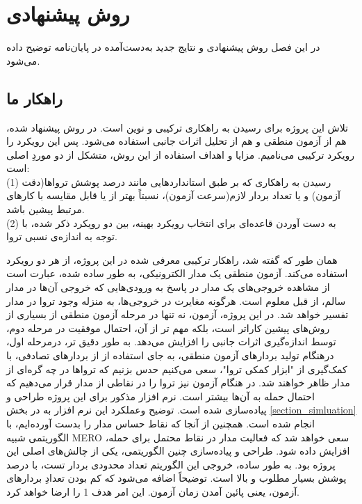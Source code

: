 \chapter{روش پیشنهادی}
در این فصل روش پیشنهادی و نتایج جدید به‌دست‌آمده در پایان‌نامه توضیح داده می‌شود.
\section{راهکار ما}
تلاش این پروژه برای رسیدن به راهکاری ترکیبی و نوین است. در روش پیشنهاد شده، هم از آزمون منطقی و هم از تحلیل اثرات جانبی استفاده می‌شود. پس این رویکرد را رویکرد ترکیبی می‌نامیم. مزایا و اهداف استفاده از این روش، متشکل از دو موردِ اصلی است: \\
(1) رسیدن به راهکاری که بر طبق استانداردهایی مانند درصد پوشش تروا‌ها(دقت آزمون) و یا تعداد بردار لازم(سرعت آزمون)، نسبتاً بهتر از یا قابل مقایسه با کارهای مرتبط پیشین باشد. \\
(2) به دست آوردن قاعده‌ای برای انتخاب رویکرد بهینه، بین دو رویکرد ذکر شده، با توجه به اندازه‌ی نسبی تروا. 

همان طور که گفته شد، راهکار ترکیبی معرفی شده در این پروژه، از هر دو رویکرد استفاده می‌کند. آزمون منطقی یک مدار الکترونیکی، به طور ساده شده، عبارت است از مشاهده خروجی‌های یک مدار در پاسخ به ورودی‌هایی که خروجی آن‌ها در مدار سالم، از قبل معلوم است. هرگونه مغایرت در خروجی‌ها، به منزله وجود تروا در مدار تفسیر خواهد شد. در این پروژه، آزمون، نه تنها در مرحله آزمون منطقی از بسیاری از روش‌های پیشین کاراتر است، بلکه مهم تر از آن، احتمال موفقیت در مرحله دوم، توسط اندازه‌گیری اثرات جانبی را افزایش می‌دهد. به طور دقیق تر، درمرحله اول، درهنگام تولید بردارهای آزمون منطقی، به جای استفاده از از بردارهای تصادفی، با کمک‌گیری از "ابزار کمکی تروا"، سعی می‌کنیم حدس بزنیم که تروا‌ها در چه گره‌ای از مدار ظاهر خواهند شد. در هنگام آزمون نیز تروا را در نقاطی از مدار قرار می‌دهیم که احتمال حمله به آن‌ها‌‌ بیشتر است. نرم افزار مذکور برای این پروژه طراحی و پیاده‌سازی شده است. توضیح وعملکرد این نرم افزار به در بخش  \ref{section_simluation} انجام شده است. همچنین از آنجا که نقاط حساس مدار را بدست آورده‌ایم، با الگوریتمی شبیه MERO سعی خواهد شد که فعالیت مدار در نقاط محتمل برای حمله، افزایش داده شود. طراحی و پیاده‌سازی چنین الگوریتمی، یکی از چالش‌های اصلی این پروژه بود. به طور ساده، خروجی این الگوریتم تعداد محدودی بردار تست، با درصد پوشش بسیار مطلوب و بالا است.  توضیحاً اضافه می‌شود که کم بودن تعدادِ بردارهای آزمون، یعنی پائین آمدن زمان آزمون. این امر هدف 1 را ارضا خواهد کرد.

